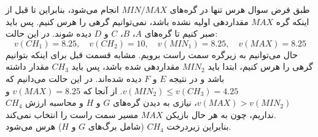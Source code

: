 \begin{ابجد}
\item طبق فرض سوال هرس تنها در گره‌های $MIN/MAX$ انجام می‌شود، بنابراین تا قبل از اینکه گره $MAX$ مقداردهی اولیه نشده باشد، نمی‌توانیم گرهی را هرس کنیم. پس باید صبر کنیم تا گره‌های $A$، $B$، $C$ و $D$ دیده شوند. در این حالت:
\begin{equation*}
    v(CH_1) = 8.25, \quad v(CH_2) = 10, \quad v(MIN_1) = 8.25, \quad v(MAX) = 8.25
\end{equation*}
حال می‌توانیم به زیرگره سمت راست برویم. مشابه قسمت قبل برای اینکه بتوانیم گرهی را هرس کنیم، ابتدا باید $MIN_2$ مقداردهی شده باشد، پس باید $CH_3$ مقدار داشته باشد و در نتیجه $E$ و $F$ دیده شده‌اند. در این حالت می‌دانیم که $v(MIN_2) \leq v(CH_3) = 4.25$. از آنجا که $v(MAX)=8.25$ و $v(MAX) > v(MIN_2)$، نیازی به دیدن گره‌های $G$ و $H$ و محاسبه ارزش $CH_4$ نداریم، چون به هر حال بازیکن $MAX$ مسیر سمت راست را انتخاب نمی‌کند. \\
بنابراین زیردرخت $CH_4$ (شامل برگ‌های $G$ و $H$) هرس می‌شود.

\end{ابجد}
